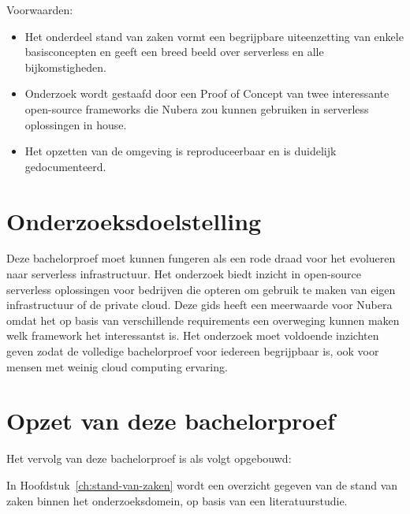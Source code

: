 Voorwaarden: 
\begin{itemize}
    \item Het onderdeel stand van zaken vormt een begrijpbare uiteenzetting van enkele basisconcepten en geeft een breed beeld over serverless en alle bijkomstigheden.
    \item Onderzoek wordt gestaafd door een Proof of Concept van  twee interessante open-source frameworks die  Nubera zou kunnen gebruiken in serverless oplossingen in house.
    \item Het opzetten van de omgeving is reproduceerbaar en is duidelijk gedocumenteerd.
\end{itemize}



\section{Onderzoeksdoelstelling}
\label{sec:onderzoeksdoelstelling}

Deze bachelorproef moet kunnen fungeren als een rode draad voor het evolueren naar serverless infrastructuur. Het onderzoek biedt inzicht in open-source serverless oplossingen voor bedrijven die opteren om gebruik te maken van eigen infrastructuur of de private cloud. Deze gids heeft een meerwaarde voor Nubera omdat het op basis van verschillende requirements een overweging kunnen maken welk framework het interessantst is. Het onderzoek moet voldoende inzichten geven zodat de volledige bachelorproef voor iedereen begrijpbaar is, ook voor mensen met weinig cloud computing ervaring.


\section{Opzet van deze bachelorproef}
\label{sec:opzet-bachelorproef}


Het vervolg van deze bachelorproef is als volgt opgebouwd:

In Hoofdstuk~\ref{ch:stand-van-zaken} wordt een overzicht gegeven van de stand van zaken binnen het onderzoeksdomein, op basis van een literatuurstudie.

